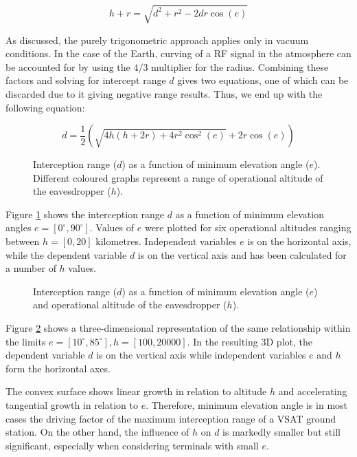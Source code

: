 \documentclass[english, 12pt, a4paper, elec, utf8, a-1b, online]{aaltothesis}
\begin{document}
\begin{equation} \label{eq-range-3}
  h + r = \sqrt{d^2 + r^2 - 2 d r \cos(e)}
\end{equation}

As discussed, the purely trigonometric approach applies only in vacuum conditions.
In the case of the Earth, curving of a RF signal in the atmosphere can be accounted for by using the $4/3$ multiplier for the radius.
Combining these factors and solving for intercept range $d$ gives two equations, one of which can be discarded due to it giving negative range results.
Thus, we end up with the following equation:

\begin{equation} \label{eq-range-4}
  d = \frac{1}{2} (\sqrt{4 h (h + 2 r) + 4 r^2 \cos^2(e)} + 2 r \cos(e))
\end{equation}

\begin{figure}[h]
  \centering
  
  \caption{Interception range ($d$) as a function of minimum elevation angle ($e$). Different coloured graphs represent a range of operational altitude of the eavesdropper ($h$).}
  \label{fig-interception-range-2d}
\end{figure}

Figure \ref{fig-interception-range-2d} shows the interception range $d$ as a function of minimum elevation angles $e = [0^\circ, 90^\circ]$.
Values of $e$ were plotted for six operational altitudes ranging between $h = [0,20]$ kilometres.
Independent variables $e$ is on the horizontal axis, while the dependent variable $d$ is on the vertical axis and has been calculated for a number of $h$ values.

\begin{figure}[h]
  \centering
  
  \caption{Interception range ($d$) as a function of minimum elevation angle ($e$) and operational altitude of the eavesdropper ($h$).}
  \label{fig-interception-range-3d}
\end{figure}

Figure \ref{fig-interception-range-3d} shows a three-dimensional representation of the same relationship within the limits $e = [10^\circ, 85^\circ], h = [100,20000]$.
In the resulting 3D plot, the dependent variable $d$ is on the vertical axis while independent variables $e$ and $h$ form the horizontal axes.

The convex surface shows linear growth in relation to altitude $h$ and accelerating tangential growth in relation to $e$.
Therefore, minimum elevation angle is in most cases the driving factor of the maximum interception range of a VSAT ground station.
On the other hand, the influence of $h$ on $d$ is markedly smaller but still significant, especially when considering terminals with small $e$.
\end{document}
